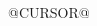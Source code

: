 \documentclass[a4paper]{article}
\begin{document}
\begin{CJK*}{GBK}{kai}
\title{}
\author{@AUTHOR@}
\date{\today}
\maketitle

\tableofcontents

@CURSOR@

\clearpage
\end{CJK*}
\end{document}
